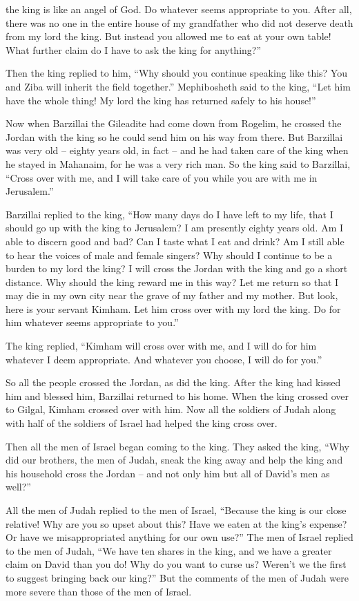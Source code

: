 {the king
is like an angel
of God.
Do
whatever
seems appropriate to you.
After
all, there was
no
one in the entire
house
of my grandfather
who did not deserve
death
from my lord
the king.
But instead you allowed me
to eat
at your own table! What
further
claim do I have
to
ask the king for anything?”
\par }{\PP {}Then the king
replied
to him, “Why
should you continue
speaking
like this? You
and Ziba
will inherit
the field together.”
Mephibosheth
said
to
the king,
“Let him have
the whole
thing! My lord
the king
has returned safely
to
his house!”
\par }{\PP {}Now when Barzillai
the Gileadite
had come down
from Rogelim,
he crossed
the Jordan
with
the king
so he could send him on his way from there.
But Barzillai
was very
old
– eighty
years old, in fact – and he had taken care of the king when he stayed in Mahanaim, for he was a very rich man.
So the king
said
to
Barzillai,
“Cross
over with
me, and I
will take care
of you while you are
with me
in Jerusalem.”
\par }{\PP {}Barzillai
replied
to
the king,
“How
many days
do I have left to my life,
that
I should go up
with
the king
to Jerusalem?
I am presently
eighty
years
old. Am
I able to discern
good
and bad? Can
I
taste
what
I eat
and drink? Am I still
able to hear
the voices
of male and female singers? Why
should I
continue
to be a burden
to
my lord
the king?
I
will cross
the Jordan
with
the king
and go a short
distance.
Why
should the king
reward
me in this way?
Let me
return
so that I may
die
in my own city
near
the grave
of my father
and my mother.
But look,
here is your servant
Kimham.
Let him cross over
with
my lord
the king.
Do
for him whatever
seems appropriate to you.”
\par }{\PP {}The king
replied,
“Kimham
will cross over
with
me, and I
will do
for him whatever I deem
appropriate.
And whatever
you choose,
I will do for you.”
\par }{\PP {}So all
the people
crossed
the Jordan,
as did the king.
After the king
had kissed
him and blessed
him, Barzillai
returned
to his home.
When the king
crossed
over to Gilgal,
Kimham
crossed
over with
him. Now all
the soldiers
of Judah
along with half
of the soldiers
of Israel
had helped the king
cross over.
\par }{\PP {}Then
all
the men
of Israel
began coming
to
the king.
They asked
the king,
“Why
did our brothers,
the men
of Judah,
sneak
the king away
and help the
king
and his household
cross
the
Jordan
– and not only him but all
of David’s
men
as well?”
\par }{\PP {}All
the men
of Judah
replied
to the men
of Israel,
“Because
the king
is our close relative! Why
are you so upset
about this? Have we eaten
at the king’s
expense? Or
have we misappropriated anything for our own use?”
The men
of Israel
replied
to the
men
of Judah,
“We have ten
shares
in the king,
and we have a greater
claim
on David
than
you do! Why
do you want to curse
us? Weren’t
we the
first
to suggest bringing back
our king?” But the comments
of the men
of Judah
were
more severe
than those of the
men
of Israel.

}
